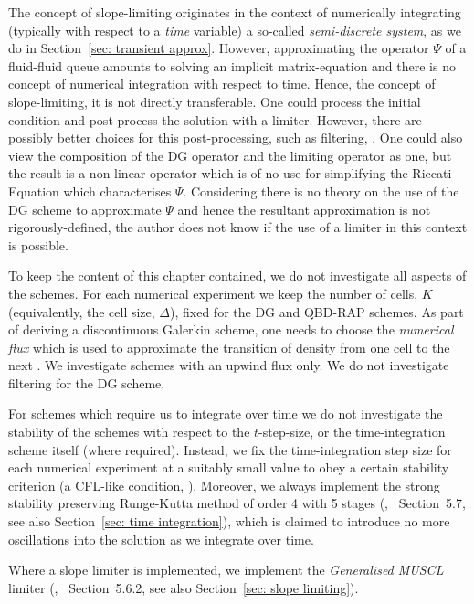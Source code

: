 The concept of slope-limiting originates in the context of numerically integrating (typically with respect to a \emph{time} variable) a so-called \emph{semi-discrete system}, as we do in Section~\ref{sec: transient approx}. However, approximating the operator \(\mathbb\Psi\) of a fluid-fluid queue amounts to solving an implicit matrix-equation and there is no concept of numerical integration with respect to time. Hence, the concept of slope-limiting, it is not directly transferable. One could process the initial condition and post-process the solution with a limiter. However, there are possibly better choices for this post-processing, such as filtering, \citep[Section~5.6.1]{nodalDGBook}. One could also view the composition of the DG operator and the limiting operator as one, but the result is a non-linear operator which is of no use for simplifying the Riccati Equation which characterises \(\mathbb \Psi\). Considering there is no theory on the use of the DG scheme to approximate \(\mathbb \Psi\) and hence the resultant approximation is not rigorously-defined, the author does not know if the use of a limiter in this context is possible. 

To keep the content of this chapter contained, we do not investigate all aspects of the schemes. For each numerical experiment we keep the number of cells, \(K\) (equivalently, the cell size, \(\Delta\)), fixed for the DG and QBD-RAP schemes. As part of deriving a discontinuous Galerkin scheme, one needs to choose the \emph{numerical flux} which is used to approximate the transition of density from one cell to the next \citep{nodalDGBook}. We investigate schemes with an upwind flux only. We do not investigate filtering for the DG scheme.

For schemes which require us to integrate over time we do not investigate the stability of the schemes with respect to the \(t\)-step-size, or the time-integration scheme itself (where required). Instead, we fix the time-integration step size for each numerical experiment at a suitably small value to obey a certain stability criterion (a CFL-like condition, \citep[Section~4.8]{nodalDGBook}). Moreover, we always implement the strong stability preserving Runge-Kutta method of order 4 with 5 stages (\cite{sr2002}, \cite{nodalDGBook}~Section~5.7, see also Section~\ref{sec: time integration}), which is claimed to introduce no more oscillations into the solution as we integrate over time. 

Where a slope limiter is implemented, we implement the \emph{Generalised MUSCL} limiter (\cite{c99}, \cite{nodalDGBook}~Section~5.6.2, see also Section~\ref{sec: slope limiting}). 

